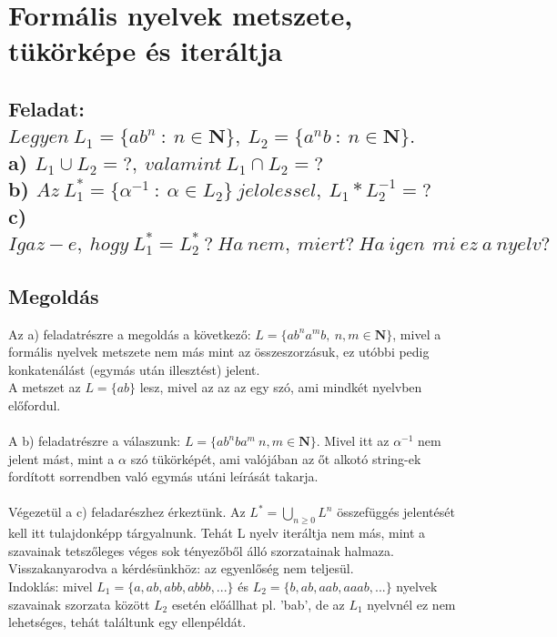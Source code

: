 \documentclass[12pt]{article}
\begin{document}
\section{Formális nyelvek metszete, tükörképe és iteráltja}
\subsection{Feladat: \\
$ Legyen \ L_{1}=\{ ab^{n} \ : \ n \in \mathbf{N} \}, \ L_{2}=\{ a^{n}b \ : \ n \in \mathbf{N} \} .$ \\
a) $ L_{1} \cup L_{2} = ?, \ valamint\ L_{1} \cap L_{2} = ? $ \\
b) $ Az \ L_{1}^{*} = \{\alpha^{-1} \ : \ \alpha \in L_{2} \} \ jelolessel, \ L_{1}*L_{2}^{-1}=? $ \\
c) $ Igaz-e, \ hogy \ L_{1}^{*}=L_{2}^{*} \ ? \ Ha\ nem,\ miert?\ Ha\ igen\,\ mi\ ez\ a\ nyelv? $}
\maketitle
\subsection{Megoldás}
Az a) feladatrészre a megoldás a következő: $ L = \{ ab^{n}a^{m}b, \ n,m \in \mathbf{N} \}$, 
mivel a formális nyelvek metszete nem más
mint az összeszorzásuk, ez utóbbi pedig konkatenálást (egymás után illesztést) jelent. \\
A metszet az $ L=\{ ab \} $ lesz, mivel az az az egy szó, ami mindkét nyelvben előfordul. \\\\
A b) feladatrészre a válaszunk: $ L = \{ ab^{n}ba^{m} \ n,m \in \mathbf{N} \} $.
Mivel itt az $ \alpha^{-1} $ nem jelent mást, mint a $ \alpha $ szó tükörképét, ami valójában az őt alkotó
string-ek fordított sorrendben való egymás utáni leírását takarja. \\\\
Végezetül a c) feladarészhez érkeztünk. Az $ L^{*} = \bigcup_{n \geq 0} L^{n} $ összefüggés jelentését
kell itt tulajdonképp tárgyalnunk. Tehát L nyelv iteráltja nem más, mint a szavainak tetszőleges véges sok
tényezőből álló szorzatainak halmaza. Visszakanyarodva a kérdésünkhöz: az egyenlőség nem teljesül. \\
Indoklás: mivel $ L_{1}=\{ a, ab, abb, abbb, ... \} $ és $ L_{2}=\{ b, ab, aab, aaab, ... \} $ nyelvek szavainak
szorzata között $L_{2}$ esetén előállhat pl. 'bab', de az $L_{1}$ nyelvnél ez nem lehetséges, tehát találtunk
egy ellenpéldát.
\end{document}
